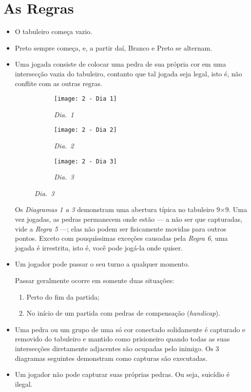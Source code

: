 \chapter{As Regras}\label{chap:regras}

\begin{itemize}
    \item[\textbf{Regra 1}] O tabuleiro começa vazio.
    \item[\textbf{Regra 2}] Preto sempre começa, e, a partir daí, Branco e Preto se alternam. 
    \item[\textbf{Regra 3}] Uma jogada consiste de colocar uma pedra de sua própria cor em uma intersecção vazia do tabuleiro, contanto que tal jogada seja legal, isto é, não conflite com as outras regras.

    \begin{figure}[h]
        \centering
        \begin{subfigure}{.3\textwidth}
            \centering
            \texttt{[image: 2 - Dia 1]}
            \caption*{\emph{Dia.\@~1}}
        \end{subfigure}
        \begin{subfigure}{.3\textwidth}
            \centering
            \texttt{[image: 2 - Dia 2]}
            \caption*{\emph{Dia.\@~2}}
        \end{subfigure}
        \begin{subfigure}{.3\textwidth}
            \centering
            \texttt{[image: 2 - Dia 3]}
            \caption*{\emph{Dia.\@~3}}
        \end{subfigure}
    \end{figure}

    Os \emph{Diagramas 1 a 3} demonstram uma abertura típica no tabuleiro 9\(\times\)9. Uma vez jogadas, as pedras permanecem onde estão --- a não ser que capturadas, vide a \emph{Regra 5} ---; elas não podem ser fisicamente movidas para outros pontos. Exceto com pouquíssimas exceções causadas pela \emph{Regra 6}, uma jogada é irrestrita, isto é, você pode jogá-la onde quiser.
    \item[\textbf{Regra 4}] Um jogador pode passar o seu turno a qualquer momento.
    
    Passar geralmente ocorre em somente duas situações:
        
    \begin{enumerate}
        \item Perto do fim da partida;
        \item No início de um partida com pedras de compensação (\emph{handicap}).
    \end{enumerate}
    \item[\textbf{Regra 5}] Uma pedra ou um grupo de uma só cor conectado solidamente é capturado e removido do tabuleiro e mantido como prisioneiro quando todas as suas intersecções diretamente adjacentes são ocupadas pelo inimigo. Os 3 diagramas seguintes demonstram como capturas são executadas.
    \item[\textbf{Regra 6}] Um jogador não pode capturar suas próprias pedras. Ou seja, suicídio é ilegal.
\end{itemize}

